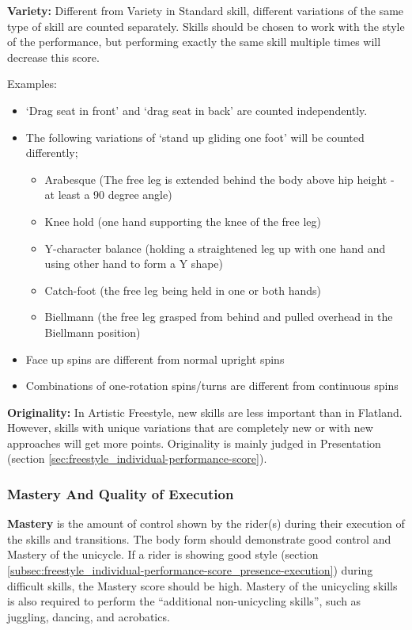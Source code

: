\textbf{Variety:} Different from Variety in Standard skill, different variations of the same type of skill are counted separately.
Skills should be chosen to work with the style of the performance, but performing exactly the same skill multiple times will decrease this score.

Examples:
\begin{itemize}
\item `Drag seat in front' and `drag seat in back' are counted independently.
\item The following variations of `stand up gliding one foot' will be counted differently;
	\begin{itemize}
 	\item Arabesque (The free leg is extended behind the body above hip height - at least a 90 degree angle)
	\item Knee hold (one hand supporting the knee of the free leg)
	\item Y-character balance (holding a straightened leg up with one hand and using other hand to form a Y shape)
	\item Catch-foot (the free leg being held in one or both hands)
	\item Biellmann (the free leg grasped from behind and pulled overhead in the Biellmann position) 
	\end{itemize}
\item Face up spins are different from normal upright spins 
\item Combinations of one-rotation spins/turns are different from continuous spins
\end{itemize}

\textbf{Originality:} In Artistic Freestyle, new skills are less important than in Flatland.
However, skills with unique variations that are completely new or with new approaches will get more points.
Originality is mainly judged in Presentation (section \ref{sec:freestyle_individual-performance-score}).

\subsubsection{Mastery And Quality of Execution}

\textbf{Mastery} is the amount of control shown by the rider(s) during their execution of the skills and transitions.
The body form should demonstrate good control and Mastery of the unicycle.
If a rider is showing good style (section \ref{subsec:freestyle_individual-performance-score_presence-execution}) during difficult skills, the Mastery score should be high.
Mastery of the unicycling skills is also required to perform the ``additional non-unicycling skills'', such as juggling, dancing, and acrobatics.

